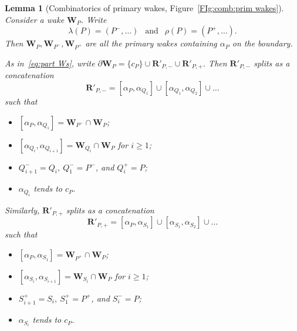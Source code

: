 \documentclass{amsart}
\renewcommand{\sp}{{\ \ }}
\newcommand{\1}{{\mathbb 1 }}
\newcommand{\bW}{{\mathbf W}}
\newcommand{\bR}{{\mathbf R}}
\newtheorem{lem}[thm]{Lemma}
\theoremstyle{remark}
\numberwithin{equation}{section}
\theoremstyle{definition}
\theoremstyle{nonumberbreak}
\begin{document}
\begin{lem}[Combinatorics of primary wakes, Figure~\ref{FIg:comb:prim wakes}]
\label{lem:prim wakes:comb}
Consider a wake $\bW_P$. Write 
\[\lambda(P)=(P^-,\dots )\sp \text{ and }\sp \rho(P)=(P^+,\dots).\]
Then $\bW_P,\bW_{P^-},\bW_{P^+}$ are all the primary wakes containing $\alpha_P$ on the boundary.


As in~\eqref{eq:part Ws}, write $\partial \bW_P=\{c_P\} \cup \bR'_{P,-}\cup \bR'_{P,+}$. Then
$\bR'_{P,-}$ splits as a concatenation 
\[\bR'_{P,-}= [\alpha_P,\alpha_{Q_1}]\cup [\alpha_{Q_1},\alpha_{Q_2}]\cup \dots\] such that
\begin{itemize}
\item $[\alpha_P,\alpha_{Q_1}]=\bW_{P^-}\cap \bW_P $;
\item $[\alpha_{Q_i}, \alpha_{Q_{i+1}}]=\bW_{Q_{i}}\cap \bW_P$ for $i\ge 1$;
\item $Q_{i+1}^-=Q_{i},~ Q_1^-=P^-$, and $Q_{i}^+=P$;
\item  $\alpha_{Q_i}$ tends to $c_P$.
\end{itemize} 

Similarly, $\bR'_{P,+}$ splits as a concatenation 
\[\bR'_{P,+}= [\alpha_P,\alpha_{S_1}]\cup [\alpha_{S_1},\alpha_{S_2}]\cup \dots\] 
such that
\begin{itemize}
\item $[\alpha_P,\alpha_{S_1}]=\bW_{P^+}\cap \bW_P $;
\item $[\alpha_{S_i}, \alpha_{S_{i+1}}]=\bW_{S_{i}}\cap \bW_P$ for $i\ge 1$;
\item $S_{i+1}^+=S_{i},~ S_1^+=P^+$, and $S_{i}^-=P$;
\item  $\alpha_{S_i}$ tends to $c_P$.
\end{itemize} 
\end{lem}
\end{document}
